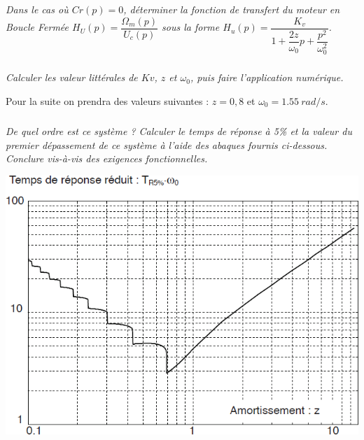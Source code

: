 \documentclass[10pt,fleqn]{article} %
\begin{document}
\begin{multicols}{2}
\subparagraph{}
\textit{Dans le cas où $Cr(p) =0$, déterminer la fonction de transfert du moteur en Boucle Fermée $H_U(p)=\dfrac{\Omega_m(p)}{U_c(p)}$ sous la forme $H_u(p)=\dfrac{K_v}{1+\dfrac{2z}{\omega_0}p+\dfrac{p^2}{\omega_0^2}}$.}

\ifprof
\begin{corrige}
\end{corrige}
\else
\fi


\subparagraph{}
\textit{Calculer les valeur littérales de $Kv$, $z$ et $\omega_0$, puis faire l’application numérique.}
\ifprof
\begin{corrige}
\end{corrige}
\else
\fi

Pour la suite on prendra des valeurs suivantes : $z=0,8$ et $\omega_0 = \SI{1,55}{rad/s}$.



\subparagraph{}
\textit{De quel ordre est ce système ? Calculer le temps de réponse à 5\% et la valeur du premier
dépassement de ce système à l’aide des abaques fournis ci-dessous. Conclure vis-à-vis des
exigences fonctionnelles.}
\ifprof
\begin{corrige}
\end{corrige}
\else
\fi

\vspace{.25cm}

\begin{center}
\includegraphics[width=\linewidth]{images/fig_07}
\end{center}


\end{multicols}
\end{document}
